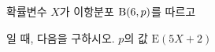 확률변수 $X$가 이항분포 $\mathrm{B}(6{,}\mkern3mu\mathopen{}p)$를 따르고\par\smallskip{}\par\smallskip\noindent 일 때, 다음을 구하시오.
 $p$의 값
 $\mathrm{E}(5X+2)$
